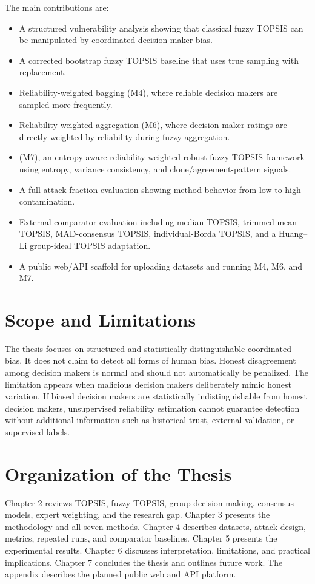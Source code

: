 The main contributions are:

\begin{itemize}
    \item A structured vulnerability analysis showing that classical fuzzy TOPSIS can be manipulated by coordinated decision-maker bias.
    \item A corrected bootstrap fuzzy TOPSIS baseline that uses true sampling with replacement.
    \item Reliability-weighted bagging (M4), where reliable decision makers are sampled more frequently.
    \item Reliability-weighted aggregation (M6), where decision-maker ratings are directly weighted by reliability during fuzzy aggregation.
    \item \methodname{} (M7), an entropy-aware reliability-weighted robust fuzzy TOPSIS framework using entropy, variance consistency, and clone/agreement-pattern signals.
    \item A full attack-fraction evaluation showing method behavior from low to high contamination.
    \item External comparator evaluation including median TOPSIS, trimmed-mean TOPSIS, MAD-consensus TOPSIS, individual-Borda TOPSIS, and a Huang--Li group-ideal TOPSIS adaptation.
    \item A public web/API scaffold for uploading datasets and running M4, M6, and M7.
\end{itemize}

\section{Scope and Limitations}

The thesis focuses on structured and statistically distinguishable coordinated bias. It does not claim to detect all forms of human bias. Honest disagreement among decision makers is normal and should not automatically be penalized. The limitation appears when malicious decision makers deliberately mimic honest variation. If biased decision makers are statistically indistinguishable from honest decision makers, unsupervised reliability estimation cannot guarantee detection without additional information such as historical trust, external validation, or supervised labels.

\section{Organization of the Thesis}

Chapter 2 reviews TOPSIS, fuzzy TOPSIS, group decision-making, consensus models, expert weighting, and the research gap. Chapter 3 presents the methodology and all seven methods. Chapter 4 describes datasets, attack design, metrics, repeated runs, and comparator baselines. Chapter 5 presents the experimental results. Chapter 6 discusses interpretation, limitations, and practical implications. Chapter 7 concludes the thesis and outlines future work. The appendix describes the planned public web and API platform.
